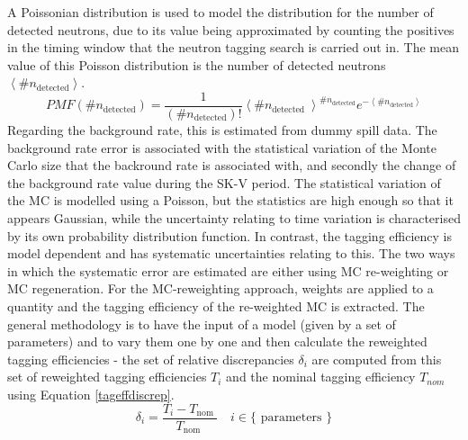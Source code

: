 A Poissonian distribution is used to model the distribution for the number of detected neutrons, due to its value being approximated by counting the positives in the timing window that the neutron tagging search is carried out in. The mean value of this Poisson distribution is the number of detected neutrons $\left\langle \# n_{\text {detected}}\right\rangle$.
\newline
\begin{equation}
    P M F\left(\# n_{\text {detected}}\right)=\frac{1}{\left(\# n_{\text {detected}}\right) !}\left\langle \# n_{\text{detected }}\right\rangle^{\# n_{\text {detected}}} e^{-\left\langle \# n_{\text {detected}}\right\rangle}
\label{poissonuncertainty}
\end{equation}
\newline
Regarding the background rate, this is estimated from dummy spill data. The background rate error is associated with the statistical variation of the Monte Carlo size that the backround rate is associated with, and secondly the change of the background rate value during the SK-V period. The statistical variation of the MC is modelled using a Poisson, but the statistics are high enough so that it appears Gaussian, while the uncertainty relating to time variation is characterised by its own probability distribution function. In contrast, the tagging efficiency is model dependent and has systematic uncertainties relating to this. The two ways in which the systematic error are estimated are either using MC re-weighting or MC regeneration.
\newline
For the MC-reweighting approach, weights are applied to a quantity and the tagging efficiency of the re-weighted MC is extracted. The general methodology is to have the input of a model (given by a set of parameters) and to vary them one by one and then calculate the reweighted tagging efficiencies - the set of relative discrepancies $\delta_{i}$ are computed from this set of reweighted tagging efficiencies $T_{i}$ and the nominal tagging efficiency $T_{nom}$ using Equation \eqref{tageffdiscrep}.
\newline
\begin{equation}
    \delta_{i}=\frac{T_{i}-T_{\text {nom }}}{T_{\text {nom }}} \quad i \in\{\text { parameters }\}
\label{tageffdiscrep}
\end{equation}
\newline

